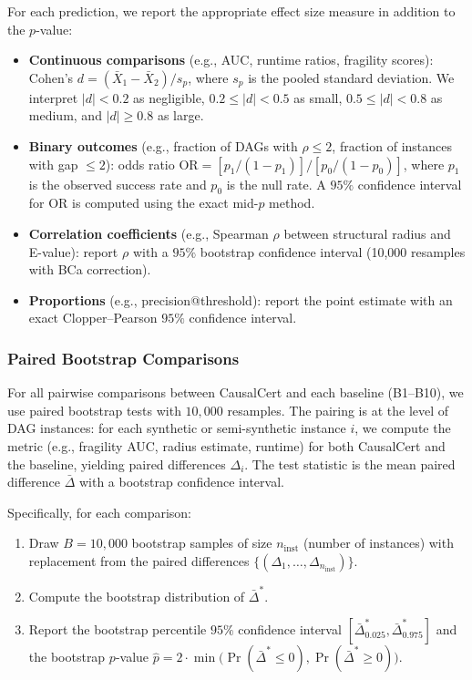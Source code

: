 \documentclass[11pt,a4paper]{article}
\theoremstyle{definition}
\theoremstyle{remark}
\newcommand{\radius}{\rho}
\begin{document}
For each prediction, we report the appropriate effect size measure in
addition to the $p$-value:
\begin{itemize}
  \item \textbf{Continuous comparisons} (e.g., AUC, runtime ratios,
    fragility scores): Cohen's $d = (\bar{X}_1 - \bar{X}_2) / s_p$,
    where $s_p$ is the pooled standard deviation. We interpret
    $|d| < 0.2$ as negligible, $0.2 \leq |d| < 0.5$ as small,
    $0.5 \leq |d| < 0.8$ as medium, and $|d| \geq 0.8$ as large.
  \item \textbf{Binary outcomes} (e.g., fraction of DAGs with
    $\radius \leq 2$, fraction of instances with gap $\leq 2$):
    odds ratio $\mathrm{OR} = [p_1 / (1-p_1)] / [p_0 / (1-p_0)]$,
    where $p_1$ is the observed success rate and $p_0$ is the null
    rate. A $95\%$ confidence interval for OR is computed using
    the exact mid-$p$ method.
  \item \textbf{Correlation coefficients} (e.g., Spearman $\rho$ between
    structural radius and E-value): report $\rho$ with a $95\%$
    bootstrap confidence interval (10{,}000 resamples with BCa
    correction).
  \item \textbf{Proportions} (e.g., precision@threshold): report the
    point estimate with an exact Clopper--Pearson $95\%$ confidence
    interval.
\end{itemize}

\subsubsection{Paired Bootstrap Comparisons}

For all pairwise comparisons between CausalCert and each baseline
(B1--B10), we use paired bootstrap tests with $10{,}000$ resamples.
The pairing is at the level of DAG instances: for each synthetic or
semi-synthetic instance $i$, we compute the metric (e.g., fragility
AUC, radius estimate, runtime) for both CausalCert and the baseline,
yielding paired differences $\Delta_i$. The test statistic is the
mean paired difference $\bar\Delta$ with a bootstrap confidence
interval.

Specifically, for each comparison:
\begin{enumerate}[label=(\roman*)]
  \item Draw $B = 10{,}000$ bootstrap samples of size $n_{\mathrm{inst}}$
    (number of instances) with replacement from the paired differences
    $\{(\Delta_1, \ldots, \Delta_{n_{\mathrm{inst}}})\}$.
  \item Compute the bootstrap distribution of $\bar\Delta^*$.
  \item Report the bootstrap percentile $95\%$ confidence interval
    $[\bar\Delta^*_{0.025}, \bar\Delta^*_{0.975}]$ and the bootstrap
    $p$-value $\hat{p} = 2 \cdot \min\bigl(\Pr(\bar\Delta^* \leq 0),
    \Pr(\bar\Delta^* \geq 0)\bigr)$.
\end{enumerate}
\end{document}
